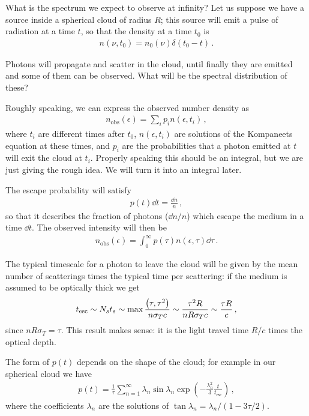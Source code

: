 \documentclass[main.tex]{subfiles}
\begin{document}
What is the spectrum we expect to observe at infinity? 
Let us suppose we have a source inside a spherical cloud of radius \(R\); this source will emit a pulse of radiation at a time \(t\), so that the density at a time \(t_0 \) is 
%
\begin{align}
n(\nu , t_0 ) = n_0 (\nu ) \delta (t_0  - t )
\,.
\end{align}

Photons will propagate and scatter in the cloud, until finally they are emitted and some of them can be observed. What will be the spectral distribution of these? 

Roughly speaking, we can express the observed number density as 
%
\begin{align}
n _{\text{obs}}(\epsilon ) = \sum _{i} p_i n(\epsilon , t_i)
\,,
\end{align}
%
where \(t_i\) are different times after \(t_0 \), \(n(\epsilon, t_i)\) are solutions of the Kompaneets equation at these times, and \(p_i\) are the probabilities that a photon emitted at \(t\) will exit the cloud at \(t_i\).
Properly speaking this should be an integral, but we are just giving the rough idea. We will turn it into an integral later.

The escape probability will satisfy 
%
\begin{align}
p(t) \dd{t} = \frac{ \dd{n}}{n}
\,,
\end{align}
%
so that it describes the fraction of photons (\(\dd{n} / n\)) which escape the medium in a time \(\dd{t}\). 
The observed intensity will then be 
%
\begin{align}
n _{\text{obs}}(\epsilon ) = \int_0^{\infty } p(\tau) n(\epsilon , \tau ) \dd{\tau }
\,.
\end{align}

The typical timescale for a photon to leave the cloud will be given by the mean number of scatterings times the typical time per scattering: if the medium is assumed to be optically thick we get 
%
\begin{align}
t _{\text{esc}} \sim N_s t_s \sim \max \frac{\qty(\tau,\tau^2) }{n \sigma _T c} \sim \frac{\tau^2 R}{nR \sigma _T c} \sim \frac{\tau R}{c}
\,,
\end{align}
%
since \(n R \sigma _T = \tau \). 
This result makes sense: it is the light travel time \(R / c\) times the optical depth. 

The form of \(p(t)\) depends on the shape of the cloud; for example in our spherical cloud we have 
%
\begin{align}
p(t) = \frac{1}{\tau } \sum _{n=1}^{\infty } \lambda_n \sin \lambda_n \exp( - \frac{\lambda _n^2}{3} \frac{t}{ t _{\text{esc}}}) 
\,,
\end{align}
%
where the coefficients \(\lambda _n\) are the solutions of \(\tan \lambda _n  = \lambda _n / (1 - 3 \tau / 2)\). 
\end{document}
